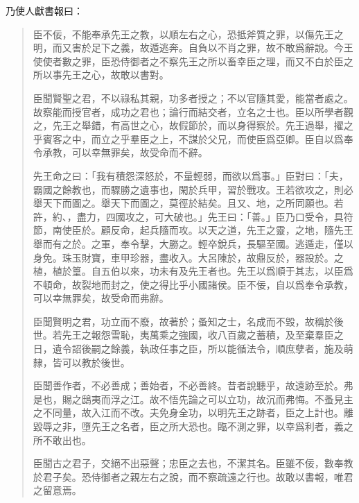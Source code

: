 乃使人獻書報曰：

\begin{quotation}
臣不佞，不能奉承先王之教，以順左右之心，恐抵斧質之罪，以傷先王之明，而又害於足下之義，故遁逃奔。自負以不肖之罪，故不敢爲辭說。今王使使者數之罪，臣恐侍御者之不察先王之所以畜幸臣之理，而又不白於臣之所以事先王之心，故敢以書對。

臣聞賢聖之君，不以祿私其親，功多者授之；不以官隨其愛，能當者處之。故察能而授官者，成功之君也；論行而結交者，立名之士也。臣以所學者觀之，先王之舉錯，有高世之心，故假節於，而以身得察於。先王過舉，擢之乎賓客之中，而立之乎羣臣之上，不謀於父兄，而使臣爲亞卿。臣自以爲奉令承教，可以幸無罪矣，故受命而不辭。

先王命之曰：「我有積怨深怒於，不量輕弱，而欲以爲事。」臣對曰：「夫，霸國之餘教也，而驟勝之遺事也，閑於兵甲，習於戰攻。王若欲攻之，則必舉天下而圖之。舉天下而圖之，莫徑於結矣。且又、地，之所同願也。若許，約、，盡力，四國攻之，可大破也。」先王曰：「善。」臣乃口受令，具符節，南使臣於。顧反命，起兵隨而攻。以天之道，先王之靈，之地，隨先王舉而有之於。之軍，奉令擊，大勝之。輕卒銳兵，長驅至國。逃遁走，僅以身免。珠玉財寶，車甲珍器，盡收入。大呂陳於，故鼎反於，器設於。之植，植於篁。自五伯以來，功未有及先王者也。先王以爲順于其志，以臣爲不頓命，故裂地而封之，使之得比乎小國諸侯。臣不佞，自以爲奉令承教，可以幸無罪矣，故受命而弗辭。

臣聞賢明之君，功立而不廢，故著於；蚤知之士，名成而不毀，故稱於後世。若先王之報怨雪恥，夷萬乘之強國，收八百歲之蓄積，及至棄羣臣之日，遺令詔後嗣之餘義，執政任事之臣，所以能循法令，順庶孽者，施及萌隸，皆可以教於後世。

臣聞善作者，不必善成；善始者，不必善終。昔者說聽乎，故遠跡至於。弗是也，賜之鴟夷而浮之江。故不悟先論之可以立功，故沉而弗悔。不蚤見主之不同量，故入江而不改。夫免身全功，以明先王之跡者，臣之上計也。離毀辱之非，墮先王之名者，臣之所大恐也。臨不測之罪，以幸爲利者，義之所不敢出也。

臣聞古之君子，交絕不出惡聲；忠臣之去也，不潔其名。臣雖不佞，數奉教於君子矣。恐侍御者之親左右之說，而不察疏遠之行也。故敢以書報，唯君之留意焉。
\end{quotation}
\vspace{-1em}
\theendnotes

